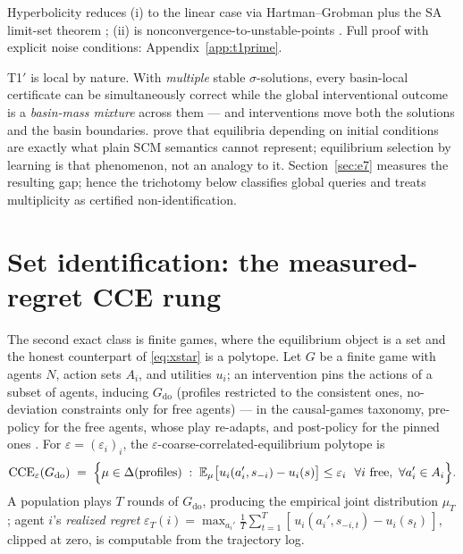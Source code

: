 \documentclass[pmlr]{jmlr}
\renewenvironment{proof}[1][\proofname]%
  {\par\noindent{\bfseries\upshape #1.\ }}{\jmlrQED}
\newcommand{\E}{\mathbb{E}}
\newcommand{\doop}{\mathrm{do}}
\newcommand{\CCE}{\mathrm{CCE}}
\begin{document}
\begin{proof}[Proof sketch]
Hyperbolicity reduces (i) to the linear case via Hartman--Grobman plus the SA limit-set theorem
\citep{kushner2003stochastic,benaim1999dynamics,borkar2008stochastic}; (ii) is
nonconvergence-to-unstable-points
\citep{pemantle1990nonconvergence,brandiere1996algorithmes}. Full proof with explicit noise
conditions: Appendix~\ref{app:t1prime}.
\end{proof}

\begin{remark}\label{rem:selection}
T1$'$ is local by nature. With \emph{multiple} stable $\sigma$-solutions, every basin-local
certificate can be simultaneously correct while the global interventional outcome is a
\emph{basin-mass mixture} across them --- and interventions move both the solutions and the
basin boundaries. \citet{blom2019beyond} prove that equilibria depending on initial conditions
are exactly what plain SCM semantics cannot represent; equilibrium selection by learning is that
phenomenon, not an analogy to it. Section~\ref{sec:e7} measures the resulting gap; hence the
trichotomy below classifies global queries and treats multiplicity as certified
non-identification.
\end{remark}

\section{Set identification: the measured-regret CCE rung}\label{sec:t2}

The second exact class is finite games, where the equilibrium object is a set and the honest
counterpart of \eqref{eq:xstar} is a polytope. Let $G$ be a finite game with agents $N$, action
sets $A_i$, and utilities $u_i$; an intervention pins the actions of a subset of agents,
inducing $G_{\doop}$ (profiles restricted to the consistent ones, no-deviation constraints only
for free agents) --- in the causal-games taxonomy, pre-policy for the free agents, whose play
re-adapts, and post-policy for the pinned ones \citep{hammond2023reasoning,mishra2024causal}. For $\varepsilon = (\varepsilon_i)_{i}$, the
$\varepsilon$-coarse-correlated-equilibrium polytope is
\begin{equation}\label{eq:cce}
\CCE_{\varepsilon}(G_{\doop}) \;=\; \Bigl\{ \mu \in \Delta(\text{profiles}) \;:\;
\E_{\mu}\bigl[u_i(a_i', s_{-i}) - u_i(s)\bigr] \leq \varepsilon_i
\ \ \forall i \text{ free},\ \forall a_i' \in A_i \Bigr\}.
\end{equation}
A population plays $T$ rounds of $G_{\doop}$, producing the empirical joint distribution $\mu_T$;
agent $i$'s \emph{realized regret}
$\varepsilon_T(i) = \max_{a_i'} \frac{1}{T}\sum_{t=1}^{T}
[\,u_i(a_i', s_{-i,t}) - u_i(s_t)\,]$, clipped at zero, is computable from the trajectory log.
\end{document}
